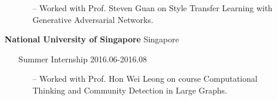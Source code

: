 \documentclass[11pt]{article}
\begin{document}
\begin{itemize}[leftmargin=0em, noitemsep, nolistsep]
\begin{itemize}[noitemsep, nolistsep, leftmargin=0em]
\begin{itemize}
                \small
                \item[--] Worked with Prof. Steven Guan on Style Transfer Learning with Generative Adversarial Networks.
             \end{itemize}
        \end{itemize} 
    \item[] \large\textbf{National University of Singapore} \hfill Singapore
        \begin{itemize}[noitemsep, nolistsep, leftmargin=0em]
            \item[] Summer Internship \hfill 2016.06-2016.08
            \begin{itemize}
                \small
                \item[--] Worked with Prof. Hon Wei Leong on course Computational Thinking and Community Detection in Large Graphs.
            \end{itemize}
        \end{itemize} 
\end{itemize}
\end{document}
